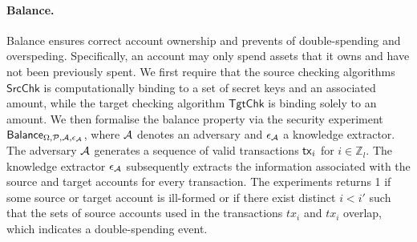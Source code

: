 \paragraph*{Balance.} Balance ensures correct account ownership and prevents of double-spending and overspeding. Specifically, an account may only spend assets that it owns and have not been previously spent. We first require that the source checking algorithms $\mathsf{SrcChk}$ is computationally binding to a set of secret keys and an associated amount, while the target checking algorithm $\mathsf{TgtChk}$ is binding solely to an amount. We then formalise the balance property via the security experiment $\mathsf{Balance}_{\Omega,\mathcal{P},\mathcal{A},\epsilon_{\mathcal{A}}}$, where $\mathcal{A}$ denotes an adversary and $\epsilon_{\mathcal{A}}$ a knowledge extractor. The adversary $\mathcal{A}$ generates a sequence of valid transactions $\mathsf{tx}_i$ for $i \in \mathbb{Z}_l$. The knowledge extractor $\epsilon_{\mathcal{A}}$ subsequently extracts the information associated with the source and target accounts for every transaction. The experiments returns 1 if some source or target account is ill-formed or if there exist distinct $i < i'$ such that the sets of source accounts used in the transactions $tx_i$ and $tx_i$ overlap, which indicates a double-spending event.



